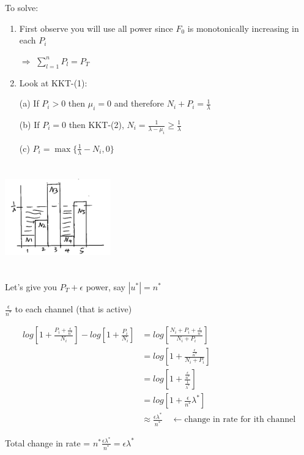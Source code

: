 To solve:

\begin{enumerate}
	\item First observe you will use all power since $F_0$ is monotonically increasing in each $P_i$
	
	$\Rightarrow$ $\sum^n_{l=1}P_l = P_T$
	
	\item Look at KKT-(1):
	
	(a) If $P_i>0$ then $\mu_i = 0$ and therefore $N_i+P_i = \frac{1}{\lambda}$
	
	(b) If $P_i= 0$ then KKT-(2), $N_i = \frac{1}{\lambda - \mu_i}\geq \frac{1}{\lambda}$
	
	(c) $P_i = \max\{\frac{1}{\lambda}-N_i, 0 \}$
\end{enumerate}
\begin{marginfigure}
	\centering
	\includegraphics[width=1.8in,height=1.8in]{figures/ch10/figure1204_2.png}
\end{marginfigure}





Let's give you $P_T+\epsilon$ power, say $|u^*| = n^*$

$\frac{\epsilon}{n^*}$ to each channel (that is active)

\begin{align*}
log[1+\frac{P_i+\frac{\epsilon}{n^*}}{N_i}] - log[1+\frac{P_i}{N_i}] &= log[\frac{N_i+P_i+\frac{\epsilon}{n^*}}{N_i+P_i}]\\
&= log[1+\frac{\frac{\epsilon}{n^*}}{N_i+P_i}] \\
&= log[1+\frac{\frac{\epsilon}{n^*}}{\frac{1}{\lambda^*}}]\\
&= log[1+\frac{\epsilon}{n^*}\lambda^*]\\
&\approx \frac{\epsilon\lambda^*}{n^*} \quad\leftarrow \text{change in rate for ith channel}
\end{align*}

Total change in rate  = $n^*\frac{\epsilon\lambda^*}{n^*} = \epsilon \lambda^*$

